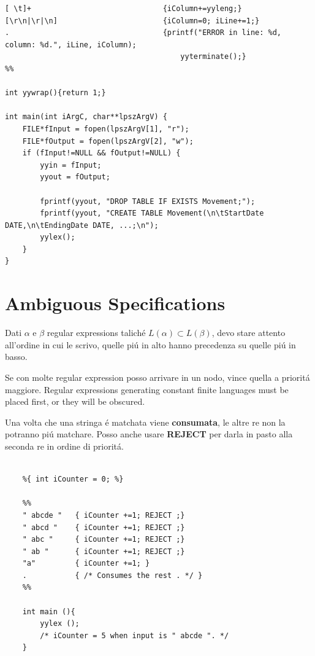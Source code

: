 \begin{lstlisting}
[ \t]+                              {iColumn+=yyleng;}
[\r\n|\r|\n]                        {iColumn=0; iLine+=1;}
.                                   {printf("ERROR in line: %d, column: %d.", iLine, iColumn); 
										yyterminate();}
%%

int yywrap(){return 1;}

int main(int iArgC, char**lpszArgV) {
    FILE*fInput = fopen(lpszArgV[1], "r");
    FILE*fOutput = fopen(lpszArgV[2], "w");
    if (fInput!=NULL && fOutput!=NULL) {
        yyin = fInput;
        yyout = fOutput;

        fprintf(yyout, "DROP TABLE IF EXISTS Movement;");
		fprintf(yyout, "CREATE TABLE Movement(\n\tStartDate DATE,\n\tEndingDate DATE, ...;\n");
        yylex();
    }
}
\end{lstlisting}

\section{Ambiguous Specifications}
Dati $\alpha$ e $\beta$ regular expressions talich\'e $L(\alpha ) \subset L(\beta )$, devo stare attento all'ordine in cui le scrivo, quelle pi\'u in alto hanno precedenza su quelle pi\'u in basso. 

\begin{tcolorbox}\begin{center}
	Se con molte regular expression posso arrivare in un nodo, vince quella a priorit\'a maggiore.
	Regular expressions generating constant finite languages must be placed first, or they will be obscured.
\end{center}\end{tcolorbox}

Una volta che una stringa \'e matchata viene \textbf{consumata}, le altre re non la potranno pi\'u matchare. 
Posso anche usare \textbf{REJECT} per darla in pasto alla seconda re in ordine di priorit\'a.

\begin{lstlisting}

	%{ int iCounter = 0; %}

	%%
	" abcde "	{ iCounter +=1; REJECT ;}
	" abcd "	{ iCounter +=1; REJECT ;}
	" abc "		{ iCounter +=1; REJECT ;}
	" ab "		{ iCounter +=1; REJECT ;}
	"a"			{ iCounter +=1; }
	.			{ /* Consumes the rest . */ }
	%%

	int main (){
		yylex ();
		/* iCounter = 5 when input is " abcde ". */
	}
\end{lstlisting}

